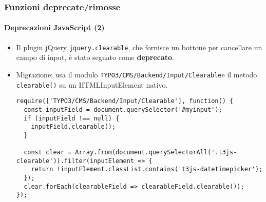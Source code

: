 
\begin{frame}[fragile]
	\frametitle{Funzioni deprecate/rimosse}
	\framesubtitle{Deprecazioni JavaScript (2)}

	\lstset{basicstyle=\tiny\ttfamily}

	\begin{itemize}
		\item Il plugin jQuery \texttt{jquery.clearable},
			che fornisce un bottone per cancellare un campo di input, è stato segnato come \textbf{deprecato}.
		\item Migrazione: usa il modulo \small\texttt{TYPO3/CMS/Backend/Input/Clearable}\normalsize e
			il metodo \texttt{clearable()} su un HTMLInputElement nativo.

\begin{lstlisting}
require(['TYPO3/CMS/Backend/Input/Clearable'], function() {
  const inputField = document.querySelector('#myinput');
  if (inputField !== null) {
    inputField.clearable();
  }

  const clear = Array.from(document.querySelectorAll('.t3js-clearable')).filter(inputElement => {
    return !inputElement.classList.contains('t3js-datetimepicker');
  });
  clear.forEach(clearableField => clearableField.clearable());
});
\end{lstlisting}

	\end{itemize}

\end{frame}



